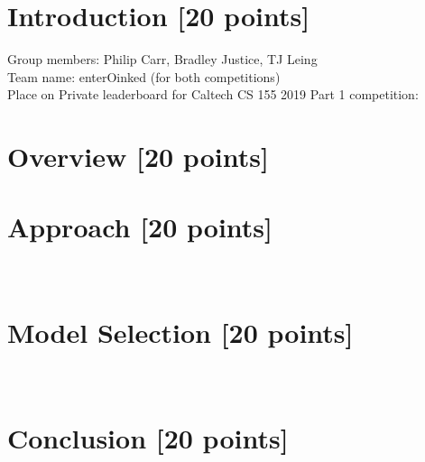 \newif\ifshowsolutions
\showsolutionstrue







\pagestyle{fancy}




\newpage

\section{Introduction [20 points]}
Group members: Philip Carr, Bradley Justice, TJ Leing\\
Team name: enterOinked (for both competitions)\\
Place on Private leaderboard for Caltech CS 155 2019 Part 1 competition: 
\newpage

\section{Overview [20 points]}
\newpage

\section{Approach [20 points]}
\newpage~
\newpage

\section{Model Selection [20 points]}
\newpage~
\newpage

\newpage
\section{Conclusion [20 points]}
\newpage~
\newpage



